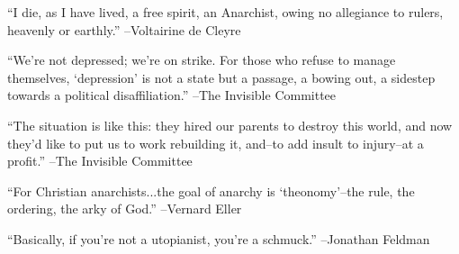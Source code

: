 \documentclass{article}%
\begin{document}
\linebreak%
\vspace{1mm}%
\begin{minipage}{\textwidth}%
\flushleft%
“I die, as I have lived, a free spirit, an Anarchist, owing no allegiance to rulers, heavenly or earthly.”%
\linebreak%
\vspace{1mm}%
–Voltairine de Cleyre%
\linebreak%
\vspace{1mm}%
\end{minipage}%
\linebreak%
\vspace{1mm}%
\begin{minipage}{\textwidth}%
\flushleft%
“We're not depressed; we're on strike. For those who refuse to manage themselves, ‘depression’ is not a state but a passage, a bowing out, a sidestep towards a political disaffiliation.”%
\linebreak%
\vspace{1mm}%
–The Invisible Committee%
\linebreak%
\vspace{1mm}%
\end{minipage}%
\linebreak%
\vspace{1mm}%
\begin{minipage}{\textwidth}%
\flushleft%
“The situation is like this: they hired our parents to destroy this world, and now they'd like to put us to work rebuilding it, and–to add insult to injury–at  a profit.”%
\linebreak%
\vspace{1mm}%
–The Invisible Committee%
\linebreak%
\vspace{1mm}%
\end{minipage}%
\linebreak%
\vspace{1mm}%
\begin{minipage}{\textwidth}%
\flushleft%
“For Christian anarchists...the goal of anarchy is ‘theonomy’–the rule, the ordering, the arky of God.”%
\linebreak%
\vspace{1mm}%
–Vernard Eller%
\linebreak%
\vspace{1mm}%
\end{minipage}%
\linebreak%
\vspace{1mm}%
\begin{minipage}{\textwidth}%
\flushleft%
“Basically, if you're not a utopianist, you're a schmuck.”%
\linebreak%
\vspace{1mm}%
–Jonathan Feldman%
\linebreak%
\vspace{1mm}%
\end{minipage}%
\end{document}
